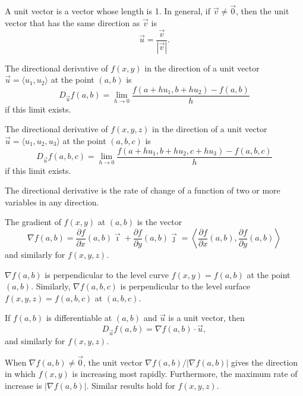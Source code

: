 \begin{definition}
	A unit vector is a vector whose length is 1. In general, if $\vec{v} \neq
	\vec{0}$, then the unit vector that has the same direction as $\vec{v}$ is
	\[
		\vec{u} = \frac{\vec{v}}{|\vec{v}|}.
	\]
\end{definition}

\begin{definition}
	The directional derivative of $f(x, y)$ in the direction of a unit vector
	$\vec{u} = \langle u_1, u_2 \rangle$ at the point $(a, b)$ is
	\[
		D_{\vec{u}} f(a, b) = \lim_{h \rightarrow 0} \frac{f(a + h u_1, b + h u_2) -
		f(a, b)}{h}
	\]
	if this limit exists.

	The directional derivative of $f(x, y, z)$ in the direction of a unit vector
	$\vec{u} = \langle u_1, u_2, u_3 \rangle$ at the point $(a, b, c)$ is
	\[
		D_{\vec{u}} f(a, b, c) = \lim_{h \rightarrow 0} \frac{f(a + h u_1, b + h
		u_2, c + h u_3) - f(a, b, c)}{h}
	\]
	if this limit exists.
\end{definition}

\begin{interpretation}
	The directional derivative is the rate of change of a function of two or more
	variables in any direction.
\end{interpretation}

\begin{definition}
	The gradient of $f(x, y)$ at $(a, b)$ is the vector
	\[
		\nabla f(a, b) = \frac{\partial f}{\partial x}(a, b) \vec{\imath} +
		\frac{\partial f}{\partial y}(a, b) \vec{\jmath} = \left\langle
		\frac{\partial f}{\partial x}(a, b), \frac{\partial f}{\partial y}(a, b)
		\right\rangle
	\]
	and similarly for $f(x, y, z)$.
\end{definition}

\begin{fact}
	$\nabla f(a, b)$ is perpendicular to the level curve $f(x, y) = f(a, b)$ at
	the point $(a, b)$. Similarly, $\nabla f(a, b, c)$ is perpendicular to the
	level surface $f(x, y, z) = f(a, b, c)$ at $(a, b, c)$.
\end{fact}

\begin{theorem}
	If $f(a, b)$ is differentiable at $(a, b)$ and $\vec{u}$ is a unit vector,
	then
	\[
		D_{\vec{u}} f(a, b) = \nabla f(a, b) \cdot \vec{u},
	\]
	and similarly for $f(x, y, z)$.
\end{theorem}

\begin{theorem}
	When $\nabla f(a, b) \neq \vec{0}$, the unit vector $\nabla f(a, b) / |\nabla
	f(a, b)|$ gives the direction in which $f(x, y)$ is increasing most rapidly.
	Furthermore, the maximum rate of increase is $|\nabla f(a, b)|$. Similar
	results hold for $f(x, y, z)$.
\end{theorem}

